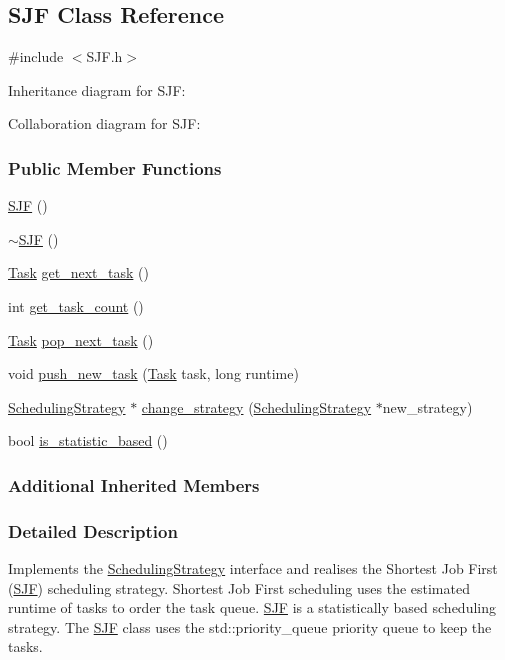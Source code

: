 \hypertarget{a00080}{}\subsection{S\+J\+F Class Reference}
\label{a00080}


{\ttfamily \#include $<$S\+J\+F.\+h$>$}



Inheritance diagram for S\+J\+F\+:


Collaboration diagram for S\+J\+F\+:
\subsubsection*{Public Member Functions}
\begin{DoxyCompactItemize}
\item 
\hyperlink{a00080_aad25acf31705ffe3de354d7ed9d246b0}{S\+J\+F} ()
\item 
\hyperlink{a00080_a355e1c11942bdc83724bb522788ef85c}{$\sim$\+S\+J\+F} ()
\item 
\hyperlink{a00002}{Task} \hyperlink{a00080_ae4b4643d0ab5399d9ead911324316f8b}{get\+\_\+next\+\_\+task} ()
\item 
int \hyperlink{a00080_a52050fbf818f6ce0e7de4d206d768af7}{get\+\_\+task\+\_\+count} ()
\item 
\hyperlink{a00002}{Task} \hyperlink{a00080_aa9c95d30d23d76c6738c9b4076574d68}{pop\+\_\+next\+\_\+task} ()
\item 
void \hyperlink{a00080_acf85a4d139f386a2a82578b32a1b3989}{push\+\_\+new\+\_\+task} (\hyperlink{a00002}{Task} task, long runtime)
\item 
\hyperlink{a00076}{Scheduling\+Strategy} $\ast$ \hyperlink{a00080_aa1816e24350bf8ee69641e79bc4354e1}{change\+\_\+strategy} (\hyperlink{a00076}{Scheduling\+Strategy} $\ast$new\+\_\+strategy)
\item 
bool \hyperlink{a00080_a113a0c4ba9bf1ede8e3189c882a7b8c7}{is\+\_\+statistic\+\_\+based} ()
\end{DoxyCompactItemize}
\subsubsection*{Additional Inherited Members}


\subsubsection{Detailed Description}
Implements the \hyperlink{a00076}{Scheduling\+Strategy} interface and realises the Shortest Job First (\hyperlink{a00080}{S\+J\+F}) scheduling strategy. Shortest Job First scheduling uses the estimated runtime of tasks to order the task queue. \hyperlink{a00080}{S\+J\+F} is a statistically based scheduling strategy. The \hyperlink{a00080}{S\+J\+F} class uses the std\+::priority\+\_\+queue priority queue to keep the tasks.

